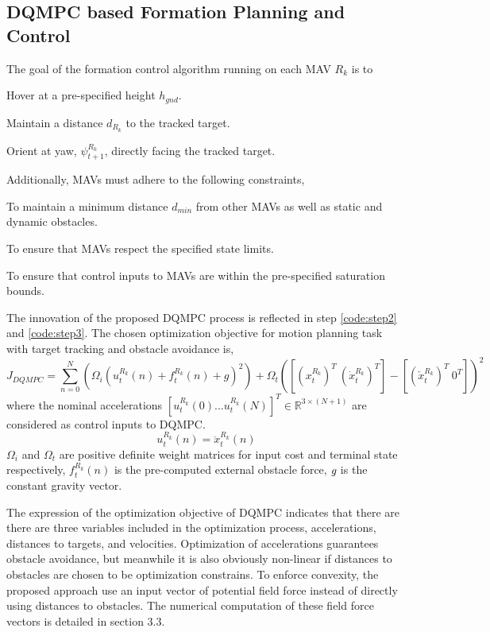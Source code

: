 \documentclass[12pt]{article}
\begin{document}
\subsection{DQMPC based Formation Planning and Control}
\label{sec:DQMPC}
The goal of the formation control algorithm running on each MAV $R_{k}$ is to
\begin{asparaenum}[1)]
\item Hover at a pre-specified height $h_{gnd}$.
\item Maintain a distance $d_{R_{k}}$ to the tracked target.
\item Orient at yaw, ${\psi}_{t+1}^{R_{k}}$, directly facing the tracked target.
\end{asparaenum}
Additionally, MAVs must adhere to the following constraints,
\begin{asparaenum}[1)]
\item To maintain a minimum distance $d_{min}$ from other MAVs as well as static and dynamic obstacles.
\item To ensure that MAVs respect the specified state limits.
\item To ensure that control inputs to MAVs are within the pre-specified saturation bounds.
\end{asparaenum}
The innovation of the proposed DQMPC process is reflected in step \ref{code:step2} and \ref{code:step3}. The chosen optimization objective for motion planning task with target tracking and obstacle avoidance is, 
\begin{equation}
J_{DQMPC}=\sum_{n=0}^{N}(\Omega_{i}(u_{t}^{R_{k}}(n)+f_{t}^{R_{k}}(n)+g)^{2})+\Omega_{t}([({x}_{t}^{R_{k}})^{T}\ (\dot{x}_{t}^{R_{k}})^{T}]-[(\check{x}_{t}^{R_{k}})^{T}\ 0^{T}])^{2}
\end{equation}
where the nominal accelerations $[u_{t}^{R_{k}}(0)...u_{t}^{R_{k}}(N)]^{T} \in \mathbb{R}^{3\times(N+1)}$ are considered as control inputs to DQMPC.
\begin{equation}
u_{t}^{R_{k}}(n)=\ddot{x}_{t}^{R_{k}}(n)
\end{equation}
$\Omega_{i}$ and $\Omega_{t}$ are positive definite weight matrices for input cost and terminal state respectively, $f_{t}^{R_{k}}(n)$ is the pre-computed external obstacle force, $\emph{g}$ is the constant gravity vector.

The expression of the optimization objective of DQMPC indicates that there are there are three variables included in the optimization process, accelerations, distances to targets, and velocities. Optimization of accelerations guarantees obstacle avoidance, but meanwhile it is also obviously non-linear if distances to obstacles are chosen to be optimization constrains. To enforce convexity, the proposed approach use an input vector of potential field force instead of directly using distances to obstacles. The numerical computation of these field force vectors is detailed in section 3.3.
\end{document}
